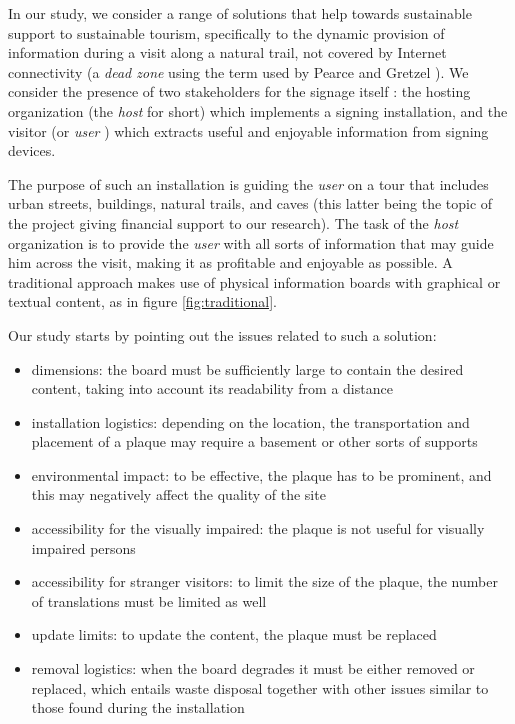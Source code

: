 \documentclass[sustainability,article,submit,pdftex,moreauthors]{Definitions/mdpi}
\begin{document}
In our study, we consider a range of solutions that help towards sustainable support to sustainable tourism, specifically to the dynamic provision of information during a visit along a natural trail, not covered by Internet connectivity (a {\em dead zone} using the term used by Pearce and Gretzel \cite{pea12a}). We consider the presence of two stakeholders for the signage itself \cite{wan22a}: the hosting organization (the {\em host} for short) which implements a signing installation, and the visitor (or {\em user} ) which extracts useful and enjoyable information from signing devices. 

The purpose of such an installation is guiding the {\em user} on a tour that includes urban streets, buildings, natural trails, and caves (this latter being the topic of the project giving financial support to our research). The task of the {\em host} organization is to provide the {\em user} with all sorts of information that may guide him across the visit, making it as profitable and enjoyable as possible. A traditional approach makes use of physical information boards with graphical or textual content, as in figure \ref{fig:traditional}.

Our study starts by pointing out the issues related to such a solution:

\begin{itemize}
	\item dimensions: the board must be sufficiently large to contain the desired content, taking into account its readability from a distance
	\item installation logistics: depending on the location, the transportation and placement of a plaque may require a basement or other sorts of supports
	\item environmental impact: to be effective, the plaque has to be prominent, and this may negatively affect the quality of the site 
	\item accessibility for the visually impaired: the plaque is not useful for visually impaired persons
	\item accessibility for stranger visitors: to limit the size of the plaque, the number of translations must be limited as well
	\item update limits: to update the content, the plaque must be replaced
	\item removal logistics: when the board degrades it must be either removed or replaced, which entails waste disposal together with other issues similar to those found during the installation
\end{itemize}
\end{document}
